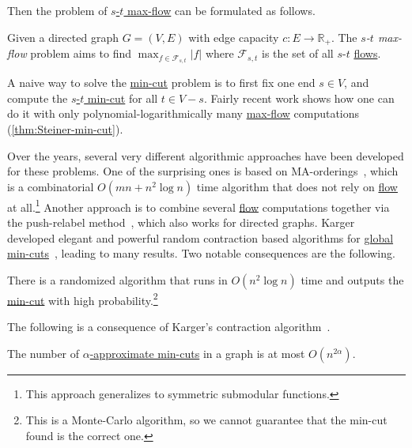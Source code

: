 Then the problem of \hyperref[prb:s-t-max-flow]{\(s\)-\(t\) max-flow} can be formulated as follows.

\begin{problem}\label{prb:s-t-max-flow}
Given a directed graph \(G = (V, E)\) with edge capacity \(c \colon E \to \mathbb{R} _{+}\). The \emph{\(s\)-\(t\) max-flow} problem aims to find \(\max _{f \in \mathcal{F} _{s, t}} \lvert f \rvert \) where \(\mathcal{F} _{s, t}\) is the set of all \(s\)-\(t\) \hyperref[def:flow]{flows}.
\end{problem}

A naive way to solve the \hyperref[prb:global-min-cut]{min-cut} problem is to first fix one end \(s \in V\), and compute the \hyperref[prb:s-t-min-cut]{\(s\)-\(t\) min-cut} for all \(t \in V - s\). Fairly recent work shows how one can do it with only polynomial-logarithmically many \hyperref[prb:s-t-max-flow]{max-flow} computations (\autoref{thm:Steiner-min-cut}).

Over the years, several very different algorithmic approaches have been developed for these problems. One of the surprising ones is based on MA-orderings~\cite{nagamochi1992computing}, which is a combinatorial \(O(mn + n^2 \log n)\) time algorithm that does not rely on \hyperref[def:flow]{flow} at all.\footnote{This approach generalizes to symmetric submodular functions.} Another approach is to combine several \hyperref[prb:s-t-max-flow]{flow} computations together via the push-relabel method~\cite{hao1994faster}, which also works for directed graphs. Karger developed elegant and powerful random contraction based algorithms for \hyperref[prb:global-min-cut]{global min-cuts}~\cite{karger1995random}, leading to many results. Two notable consequences are the following.

\begin{theorem}\label{thm:Karger-min-cut}
	There is a randomized algorithm that runs in \(O(n^2 \log n)\) time and outputs the \hyperref[prb:global-min-cut]{min-cut} with high probability.\footnote{This is a Monte-Carlo algorithm, so we cannot guarantee that the min-cut found is the correct one.}
\end{theorem}

The following is a consequence of Karger's contraction algorithm~\cite{karger1995random}.

\begin{theorem}\label{thm:number-approximate-min-cut}
	The number of \hyperref[def:approximate-min-cut]{\(\alpha \)-approximate min-cuts} in a graph is at most \(O(n^{2 \alpha })\).
\end{theorem}

